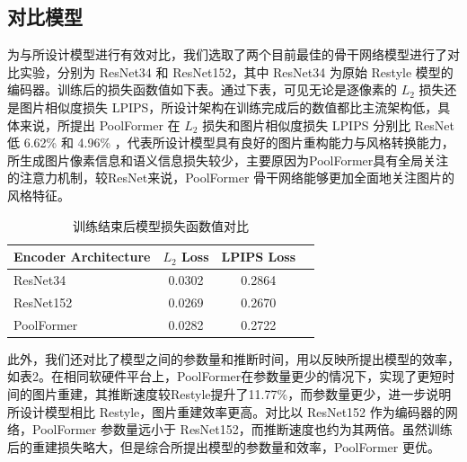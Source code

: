 \subsection{对比模型}

为与所设计模型进行有效对比，我们选取了两个目前最佳的骨干网络模型进行了对比实验，分别为 ResNet34 和 ResNet152，其中 ResNet34 为原始 Restyle 模型的编码器。训练后的损失函数值如下表。通过下表，可见无论是逐像素的 $L_{2}$ 损失还是图片相似度损失 LPIPS，所设计架构在训练完成后的数值都比主流架构低，具体来说，所提出 PoolFormer 在 $L_{2}$ 损失和图片相似度损失 LPIPS 分别比 ResNet 低 6.62\% 和 4.96\% ，代表所设计模型具有良好的图片重构能力与风格转换能力，所生成图片像素信息和语义信息损失较少，主要原因为PoolFormer具有全局关注的注意力机制，较ResNet来说，PoolFormer 骨干网络能够更加全面地关注图片的风格特征。

\begin{table}[htb]
    \centering
    \begin{minipage}[t]{0.55\linewidth} %
        \caption[模型损失函数值对比]{训练结束后模型损失函数值对比}
        \label{tab:example-table-basic}
        \begin{small}
        \begin{tabular}{@{}lccc@{}}
         \toprule[1.5pt]
        Encoder Architecture & $L_{2}$ Loss & LPIPS Loss \\
         \midrule[1pt]
          ResNet34 & 0.0302 & 0.2864 \\
          ResNet152 & 0.0269 & 0.2670 \\
          PoolFormer & 0.0282 & 0.2722 \\
          \bottomrule[1.5pt]
        \end{tabular}
        \end{small}
    \end{minipage}
\end{table}

此外，我们还对比了模型之间的参数量和推断时间，用以反映所提出模型的效率，如表2。在相同软硬件平台上，PoolFormer在参数量更少的情况下，实现了更短时间的图片重建，其推断速度较Restyle提升了11.77\%，而参数量更少，进一步说明所设计模型相比 Restyle，图片重建效率更高。对比以 ResNet152 作为编码器的网络，PoolFormer 参数量远小于 ResNet152，而推断速度也约为其两倍。虽然训练后的重建损失略大，但是综合所提出模型的参数量和效率，PoolFormer 更优。

